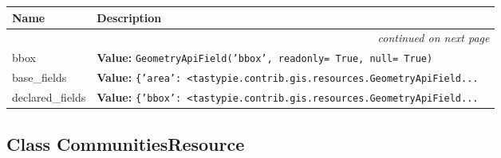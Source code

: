     \vspace{-1cm}
\hspace{\varindent}\begin{longtable}{|p{\varnamewidth}|p{\vardescrwidth}|l}
\cline{1-2}
\cline{1-2} \centering \textbf{Name} & \centering \textbf{Description}& \\
\cline{1-2}
\endhead\cline{1-2}\multicolumn{3}{r}{\small\textit{continued on next page}}\\\endfoot\cline{1-2}
\endlastfoot\raggedright b\-b\-o\-x\- & \raggedright \textbf{Value:} 
{\tt GeometryApiField('bbox', readonly= True, null= True)}&\\
\cline{1-2}
\raggedright b\-a\-s\-e\-\_\-f\-i\-e\-l\-d\-s\- & \raggedright \textbf{Value:} 
{\tt \texttt{\{}\texttt{'}\texttt{area}\texttt{'}\texttt{: }{\textless}tastypie.contrib.gis.resources.GeometryApiField\texttt{...}}&\\
\cline{1-2}
\raggedright d\-e\-c\-l\-a\-r\-e\-d\-\_\-f\-i\-e\-l\-d\-s\- & \raggedright \textbf{Value:} 
{\tt \texttt{\{}\texttt{'}\texttt{bbox}\texttt{'}\texttt{: }{\textless}tastypie.contrib.gis.resources.GeometryApiField\texttt{...}}&\\
\cline{1-2}
\end{longtable}



\subsection{Class CommunitiesResource}

